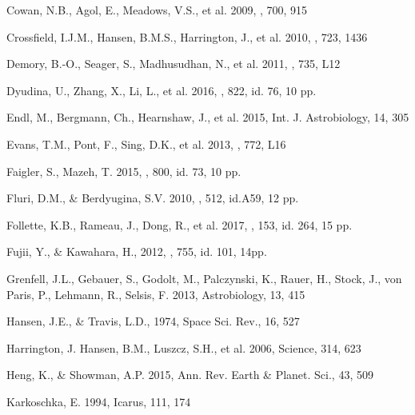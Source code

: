 \documentclass{emulateapj}
\begin{document}
\begin{thebibliography}{}
Cowan, N.B., Agol, E., Meadows, V.S., et al. 
   2009, \apj, 700, 915
   
Crossfield, I.J.M., Hansen, B.M.S., Harrington, J., et al. 
   2010, \apj, 723, 1436

Demory, B.-O., Seager, S., Madhusudhan, N., et al. 
   2011, \apjl, 735, L12  

Dyudina, U., Zhang, X., Li, L., et al.    
    2016, \apj, 822, id. 76, 10 pp.
	
Endl, M., Bergmann, Ch., Hearnshaw, J., et al.   
   2015, Int. J. Astrobiology, 14, 305
   
Evans, T.M., Pont, F., Sing, D.K., et al.
   2013, \apjl,  772, L16

Faigler, S., Mazeh, T.
   2015, \apj, 800, id. 73, 10 pp.
   
Fluri, D.M., \& Berdyugina, S.V.
   2010, \aap, 512, id.A59, 12 pp.

Follette, K.B., Rameau, J., Dong, R., et al.
   2017,  \aj, 153, id. 264, 15 pp.
   
Fujii, Y., \& Kawahara, H., 
   2012, \apj, 755, id. 101, 14pp. 
   
Grenfell, J.L., Gebauer, S., Godolt, M., Palczynski, K., Rauer, H., Stock, J., von Paris, P., Lehmann, R., Selsis, F.
   2013, Astrobiology, 13, 415

Hansen, J.E., \& Travis, L.D., 
   1974, Space Sci. Rev., 16, 527
   
Harrington, J. Hansen, B.M., Luszcz, S.H., et al.
   2006, Science, 314, 623

Heng, K., \& Showman, A.P.
   2015, Ann. Rev. Earth \& Planet. Sci., 43, 509 
   
Karkoschka, E. 
   1994, Icarus, 111, 174


\end{thebibliography}
\end{document}
